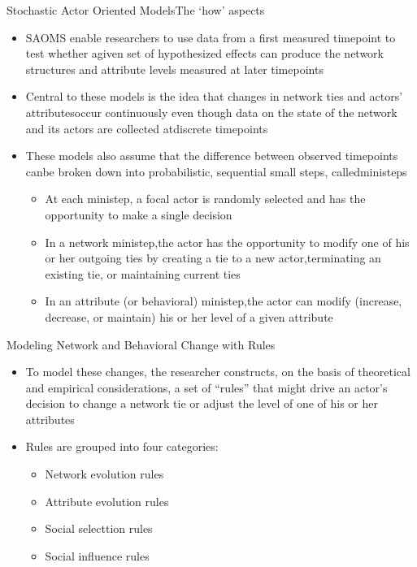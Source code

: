 \documentclass[notes, aspectratio=1610]{beamer}
\begin{document}
\begin{frame}{Stochastic Actor Oriented Models}{The `how' aspects}
\begin{itemize}
	\item SAOMS enable researchers to use data from a first measured 
	timepoint to test whether agiven set of hypothesized effects can 
	produce the network structures and attribute levels measured at 
	later timepoints
	\item Central to these models is the idea that changes in network ties 
	and actors' attributesoccur continuously even though data on the state 
	of the network and its actors are collected atdiscrete timepoints
	\item These models also assume that the difference between observed 
	timepoints canbe broken down into probabilistic, sequential small 
	steps, calledministeps
	\begin{itemize}
		\item At each ministep, a focal actor is randomly 
	         selected and has the opportunity to make a single decision
		\item In a network ministep,the actor has the opportunity to 
		modify one of his or her outgoing ties by creating a tie to a 
		new actor,terminating an existing tie, or maintaining current ties
		\item In an attribute (or behavioral) ministep,the actor can 
		modify (increase, decrease, or maintain) his or her level of a 
		given attribute
	\end{itemize}
\end{itemize}
\end{frame}

\begin{frame}{Modeling Network and Behavioral Change with Rules}{}
	\begin{itemize}
	\item To model these changes, the researcher constructs, on the basis of 
	theoretical and empirical considerations, a set of ``rules'' that 
	might drive an actor's decision to change a network tie or adjust
	the level of one of his or her attributes
	\item Rules are grouped into four categories:
		\begin{itemize}
		\item Network evolution rules 
		\item Attribute evolution rules 
		\item Social selecttion rules 
		\item Social influence rules 
		\end{itemize}
	\end{itemize}
\end{frame}
\end{document}

